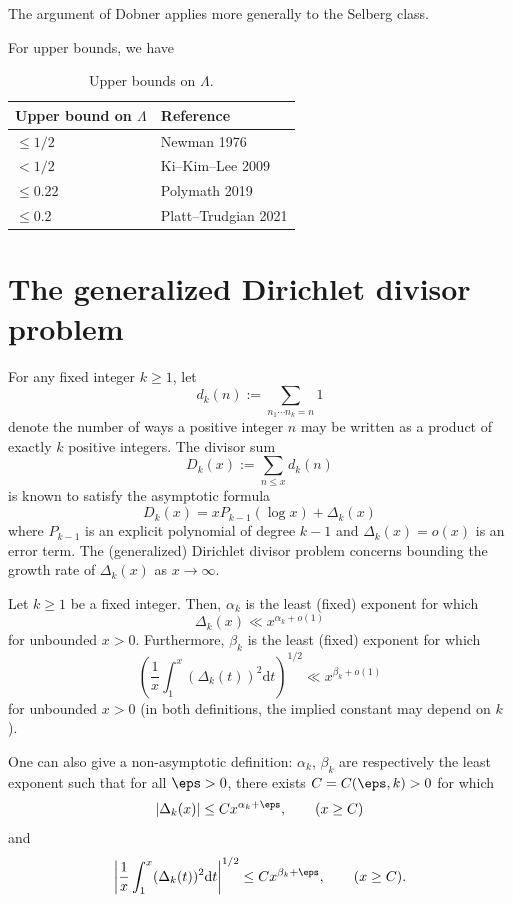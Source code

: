   The argument of Dobner applies more generally to the Selberg class.

  For upper bounds, we have
  \begin{table}[ht]
    \caption{Upper bounds on $\Lambda$.}
    \begin{tabular}{|l|l|}
    \hline
    Upper bound on $\Lambda$ & Reference \\
    \hline
    $\leq 1/2$ & Newman 1976 \cite{newman} \\
    $< 1/2$ & Ki--Kim--Lee 2009 \cite{kkl} \\
    $\leq 0.22$ & Polymath 2019 \cite{polymath15} \\
    $\leq 0.2$ & Platt--Trudgian 2021 \cite{platt-trudgian} \\
    \hline
  \end{tabular}
\end{table}


\chapter{The generalized Dirichlet divisor problem}\label{divisor-chapter}

For any fixed integer $k \ge 1$, let
\[
d_k(n) := \sum_{n_1 \cdots n_k = n}1
\]
denote the number of ways a positive integer $n$ may be written as a product of exactly $k$ positive integers. The divisor sum
\[
D_k(x) := \sum_{n \leq x} d_k(n)
\]
is known to satisfy the asymptotic formula
\[
D_k(x) = x P_{k - 1}(\log x) + \Delta_k(x)
\]
where $P_{k - 1}$ is an explicit polynomial of degree $k-1$ and $\Delta_k(x) = o(x)$ is an error term. The (generalized) Dirichlet divisor problem concerns bounding the growth rate of $\Delta_k(x)$ as $x\to\infty$.

\begin{definition}\label{divisor-def} Let $k \geq 1$ be a fixed integer. Then, $\alpha_k$ is the least (fixed) exponent for which
$$ \Delta_k(x) \ll x^{\alpha_k+o(1)}$$
for unbounded $x > 0$. Furthermore, $\beta_k$ is the least (fixed) exponent for which
\[
\left(\frac{1}{x}\int_1^x (\Delta_k(t))^2\text{d}t\right)^{1/2} \ll x^{\beta_k + o(1)}
\]
for unbounded $x > 0$ (in both definitions, the implied constant may depend on $k$).
\end{definition}

One can also give a non-asymptotic definition: $\alpha_k$, $\beta_k$ are respectively the least exponent such that for all $\eps > 0$, there exists $C = C(\eps, k) > 0$ for which
\[
|\Delta_k(x)| \leq C x^{\alpha_k + \eps},\qquad (x \ge C)
\]
and
\[
\left|\frac{1}{x}\int_1^x(\Delta_k(t))^2\text{d}t\right|^{1/2} \le Cx^{\beta_k + \eps},\qquad (x \ge C).
\]

